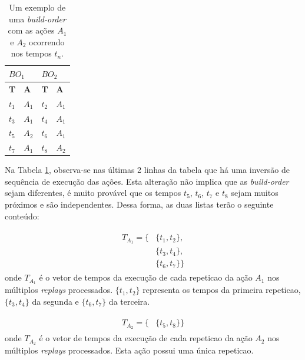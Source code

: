 \begin{table}[H]
\centering
\caption{\label{tab:treinamento-exemplo} Um exemplo de uma \textit{\gls{build-order}} com as ações $A_1$ e $A_2$ ocorrendo nos tempos $t_n$.}
\begin{tabular}{|l|l||l|l|}
\hline
\multicolumn{2}{|l||}{\centering $BO_1$} & \multicolumn{2}{l|}{\centering $BO_2$} \\ \hline
\textbf{T}  & \textbf{A}  & \textbf{T}  & \textbf{A} \\ \hline
$t_1$       & $A_1$       & $t_2$       & $A_1$      \\ \hline
$t_3$       & $A_1$       & $t_4$       & $A_1$      \\ \hline
$t_5$       & $A_2$       & $t_6$       & $A_1$      \\ \hline
$t_7$       & $A_1$       & $t_8$       & $A_2$      \\ \hline
\end{tabular}
\end{table}

Na Tabela \ref{tab:treinamento-exemplo}, observa-se nas últimas 2 linhas da tabela que há uma inversão de sequência de execução das ações. Esta alteração não implica que as \textit{\gls{build-order}} sejam diferentes, é muito provável que os tempos $t_5$, $t_6$, $t_7$ e $t_8$ sejam muitos próximos e são independentes. Dessa forma, as duas listas terão o seguinte conteúdo:

\begin{align}
\begin{split}
    T_{A_1} = \{
		&\{t_1, t_2\}, 		\\
		&\{t_3, t_4\}, 		\\
		&\{t_6, t_7\}
	\}
\end{split}
\label{eq:metodo-exemplo-vetor-tempos-a1}
\end{align}
\noindent onde $T_{A_1}$ é o vetor de tempos da execução de cada \gls{repeticao} da ação $A_1$ nos múltiplos \textit{\glspl{replay}} processados. $\{t_1, t_2\}$ representa os tempos da primeira \gls{repeticao}, $\{t_3, t_4\}$ da segunda e $\{t_6, t_7\}$ da terceira.

\begin{align}
\begin{split}
    T_{A_2} = \{
		&\{t_5, t_8\}
	\}
\end{split}
\label{eq:metodo-exemplo-vetor-tempos-a2}
\end{align}
\noindent onde $T_{A_2}$ é o vetor de tempos da execução de cada \gls{repeticao} da ação $A_2$ nos múltiplos \textit{\glspl{replay}} processados. Esta ação possui uma única \gls{repeticao}.

